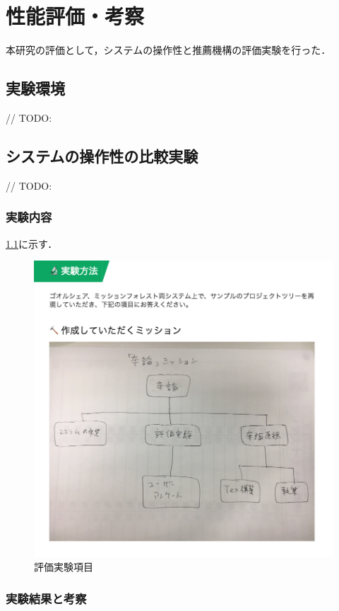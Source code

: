 \chapter{性能評価・考察}
本研究の評価として，システムの操作性と推薦機構の評価実験を行った．

\section{実験環境}
// TODO:

\section{システムの操作性の比較実験}
// TODO:

\subsection{実験内容}
\ref{img:experiment_question}に示す．

\begin{figure}[t]
	\begin{center}
		\includegraphics[width=0.9\linewidth]{assets/img/experiment_question.png}
		\caption{評価実験項目}
		\label{img:experiment_question}
	\end{center}
\end{figure}

\subsection{実験結果と考察}


